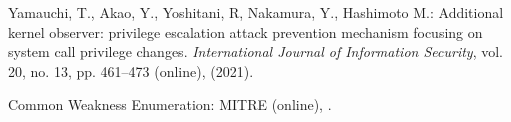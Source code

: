 \documentclass[english,preprint,JIP]{ipsj}
\begin{document}
\begin{thebibliography}{99}
  Yamauchi, T., Akao, Y., Yoshitani, R, Nakamura, Y., Hashimoto M.: Additional kernel observer: privilege escalation attack prevention mechanism focusing on system call privilege changes. \textit{International Journal of Information Security}, vol. 20, no. 13, pp. 461--473 (online),  (2021).

  Common Weakness Enumeration: MITRE (online),  .


\end{thebibliography}
\end{document}
